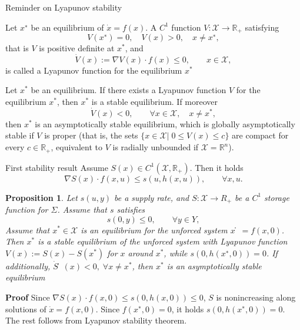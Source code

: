 \documentclass[aspectratio=169]{beamer}
\newcommand{\bbR}{\mathbb{R}}
\newtheorem{proposition}{Proposition}
\begin{document}
\begin{frame}{Reminder on Lyapunov stability}
	
	\begin{definition}
	Let $x^∗$ be an equilibrium of $\dot{x} = f(x)$. A $C^1$ function $V : \mathcal{X}\rightarrow \bbR_+$
	satisfying
	\begin{equation*}
		V(x^∗) = 0, \quad V(x) > 0, \quad x \neq x^∗,
	\end{equation*}
	that is $V$ is positive definite at $x^*$, and
	\begin{equation*}
	\dot{V}(x) := \nabla V(x) \cdot f(x) \le 0, \qquad x \in \mathcal{X},
	\end{equation*}
	is called a Lyapunov function for the equilibrium $x^*$
	\end{definition}

\begin{theorem}
	Let $x^*$ be an equilibrium. If there exists a Lyapunov function $V$
	for the equilibrium $x^*$, then $x^*$ is a stable equilibrium. If moreover
	\begin{equation*}
		\dot{V}(x) <0, \qquad \forall x \in \mathcal{X}, \quad x\neq x^*,
	\end{equation*}
	then $x^*$ is an asymptotically stable equilibrium, which is globally asymptotically
	stable if $V$ is proper (that is, the sets $\{x \in \mathcal{X} |\; 0 \le V (x) \le c\}$ are compact for every
	$c \in \bbR_+$, equivalent to $V$ is radially unbounded if $\mathcal{X} = \bbR^n$).
\end{theorem}
\end{frame}

\begin{frame}{First stability result}
	Assume $S(x) \in C^1(\mathcal{X}, \bbR_+)$. Then it holds
	\begin{equation*}
		\nabla S(x)\cdot f(x, u) \le s(u, h(x, u)), \qquad \forall x, u. 
	\end{equation*}

	\begin{proposition}
		Let $s(u, y)$ be a supply rate, and $S : \mathcal{X} \rightarrow R_+$ be a $C^1$ storage
		function for $\Sigma$. Assume that $s$ satisfies
		\begin{equation*}
			s(0, y) \le 0, \qquad \forall y \in Y,
		\end{equation*}
		Assume that $x^* \in \mathcal{X}$ is an equilibrium for the unforced system $ẋ = f (x, 0)$. Then $x^*$ is a stable equilibrium of the unforced system  with Lyapunov function $V(x):=
		S(x) - S(x^*)$ for $x$ around $x^*$, while $s(0, h(x^∗, 0)) = 0$. If additionally, $\dot{S}̇(x) < 0, \; \forall x \neq x^*$, then $x^*$ is an asymptotically stable equilibrium
	\end{proposition}
\textbf{Proof} Since $\nabla S(x) \cdot f(x, 0) \le s(0, h(x, 0)) \le 0$, $S$ is nonincreasing along solutions of $\dot{x}=f(x,0)$. Since $f(x^∗ , 0) = 0$, it holds $s(0, h(x^∗, 0)) = 0$. The rest follows from Lyapunov stability theorem.
	
\end{frame}
\end{document}
